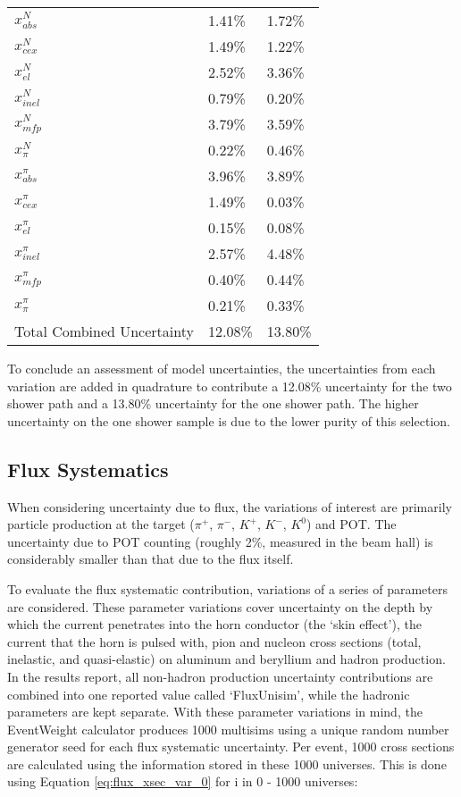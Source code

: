 \begin{table*}
\begin{tabular}{| l | l | l |}
$x_{abs}^{N}$ & 1.41\% & 1.72\% \\
$x_{cex}^{N}$ & 1.49\% & 1.22\%\\
$x_{el}^{N}$ & 2.52\% & 3.36\% \\
$x_{inel}^{N}$ & 0.79\% & 0.20\% \\
$x_{mfp}^{N}$ & 3.79\% & 3.59\% \\
$x_{\pi}^{N}$ & 0.22\% & 0.46\% \\
$x_{abs}^{\pi}$ & 3.96\% & 3.89\% \\
$x_{cex}^{\pi}$ & 1.49\% & 0.03\% \\
$x_{el}^{\pi}$ & 0.15\% & 0.08\% \\
$x_{inel}^{\pi}$ & 2.57\% & 4.48\% \\
$x_{mfp}^{\pi}$ & 0.40\% & 0.44\% \\
$x_{\pi}^{\pi}$ & 0.21\% & 0.33\% \\
\hline
Total Combined Uncertainty & 12.08\% & 13.80\% \\ \hline
\end{tabular}
\end{table*}


To conclude an assessment of model uncertainties, the uncertainties from each variation are added in quadrature to contribute a 12.08\% uncertainty for the two shower path and a 13.80\% uncertainty for the one shower path.  The higher uncertainty on the one shower sample is due to the lower purity of this selection.

\clearpage
\subsection{Flux Systematics}
When considering uncertainty due to flux, the variations of interest are primarily particle production at the target ($\pi^+$, $\pi^-$, $K^+$, $K^-$, $K^0$) and POT.  The uncertainty due to POT counting (roughly 2\%, measured in the beam hall) is considerably smaller than that due to the flux itself. 
\par To evaluate the flux systematic contribution, variations of a series of parameters are considered.  These parameter variations cover uncertainty on the depth by which the current penetrates into the horn conductor (the ‘skin effect’), the current that the horn is pulsed with, pion and nucleon cross sections (total, inelastic, and quasi-elastic) on aluminum and beryllium and hadron production. In the results report, all non-hadron production uncertainty contributions are combined into one reported value called `FluxUnisim', while the hadronic parameters are kept separate. With these parameter variations in mind, the EventWeight calculator produces 1000 multisims using a unique random number generator seed for each flux systematic uncertainty. Per event, 1000 cross sections are calculated using the information stored in these 1000 universes.  This is done using Equation \ref{eq:flux_xsec_var_0} for i in 0 - 1000 universes:

